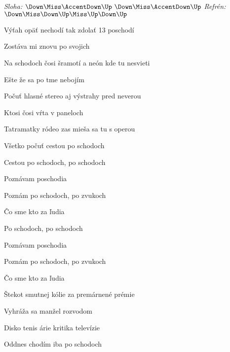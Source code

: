 \begin{song}


\begin{headerbox}
\RaiseBoxWithAccents
{} \quad
\textit{Sloha:} $\Down\Miss\AccentDown\Up\ \Down\Miss\AccentDown\Up$ \quad
\textit{Refrén:} $\Down\Miss\Down\Up\Miss\Up\Down\Up$
\end{headerbox}

\begin{hchordbox}
\end{hchordbox}

\Large

\bigskip

Výťah opäť nechodí tak zdolať 13 poschodí \par
{}Zostáva mi znovu po svojich \par
Na schodoch čosi šramotí a neón kde tu nesvieti \par
{}Ešte že sa po tme nebojím \par

\bigskip

Počuť hlasné stereo aj výstrahy pred neverou \par
{}Ktosi čosi vŕta v paneloch \par
{}Tatramatky ródeo zas mieša sa tu s operou \par
{}Všetko počuť cestou po schodoch \par

\bigskip

\begin{chorusbox}{\Refren}
Cestou po schodoch, po schodoch \par
{}Poznávam poschodia \par
Poznám po schodoch, po zvukoch \par
{} Čo sme kto za ľudia \par

\bigskip

Po schodoch, po schodoch \par
{}Poznávam poschodia \par
Poznám po schodoch, po zvukoch \par
{} Čo sme kto za ľudia \par
\end{chorusbox}

\bigskip

Štekot smutnej kólie za premárnené prémie \par
{}Vyhráža sa manžel rozvodom \par
{}Disko tenis árie kritika televízie \par
{}Oddnes chodím iba po schodoch \par

\bigskip

\Refren {}

\end{song}
